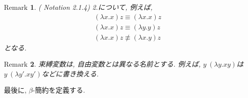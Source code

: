 \documentclass[11pt]{jsreport}
\theoremstyle{mystyle}
\newtheorem{df}{$\textrm{Definition}$}[subsection]
\newtheorem{rmk}[df]{$\textrm{Remark}$}
\newcommand{\Lra}{\Longrightarrow}
\newcommand{\0}{\textbf{0}}
\newcommand{\1}{\textbf{1}}
\newcommand{\2}{\textbf{2}}
\begin{document}
\begin{rmk}{(\cite{Bar} Notation 2.1.4)}
2.について, 例えば, 
\begin{align*}
  (\lambda x .x) z \equiv (\lambda x .x) z \\ 
  (\lambda x .x) z \equiv (\lambda y .y) z \\
  (\lambda x .x) z \nequiv (\lambda x .y) z
\end{align*}
となる. 
\end{rmk}
\begin{rmk}
  束縛変数は, 自由変数とは異なる名前とする. 例えば, $y\ (\lambda y . xy)$は
  $y\ (\lambda y' . xy')$などに書き換える. 
\end{rmk}
最後に, $\beta$-簡約を定義する. 
\end{document}
